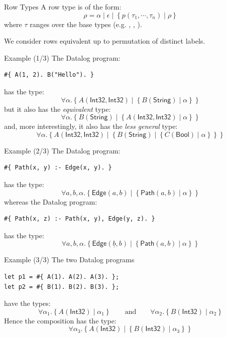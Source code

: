 \begin{frame}[fragile]{Row Types}
A row type is of the form:
$$
\rho = \alpha \mid \epsilon \mid \left \{ p (\tau_1, \cdots, \tau_n) \mid \rho \right \}
$$
where $\tau$ ranges over the base types (e.g. , , ).

\medskip

\pause

We consider rows equivalent up to permutation of distinct labels.
\end{frame}

\begin{frame}[fragile]{Example (1/3)}
The Datalog program:
%
\begin{lstlisting}[language=flix, xleftmargin=0.8cm]
#{ A(1, 2). B("Hello"). }
\end{lstlisting}    
%
has the type:
%
\[
\forall \alpha. \left\{ A(\textsf{Int32}, \textsf{Int32}) \mid \left\{ B(\textsf{String}) \mid \alpha \right\} \right\}
\]
%
\pause but it also has the \emph{equivalent} type:
%
\[
\forall \alpha. \left\{ B(\textsf{String}) \mid \left\{ A(\textsf{Int32}, \textsf{Int32}) \mid \alpha \right\} \right\}
\]
%
\pause and, more interestingly, it also has the \emph{less general} type:
%
\[
\forall \alpha. \left\{ A(\textsf{Int32}, \textsf{Int32}) \mid \left\{ B(\textsf{String}) \mid \left\{ C(\textsf{Bool}) \mid \alpha \right\} \right\} \right\}
\]
%
\end{frame}

\begin{frame}[fragile]{Example (2/3)}
The Datalog program:
%
\begin{lstlisting}[language=flix, xleftmargin=0.8cm]
#{ Path(x, y) :- Edge(x, y). }
\end{lstlisting}    
%
has the type:
%
\[
\forall a, b, \alpha. \left\{ \textsf{Edge}(a, b) \mid \left\{ \textsf{Path}(a, b) \mid \alpha \right\} \right\}
\]
%
\pause whereas the Datalog program:
%
\begin{lstlisting}[language=flix, xleftmargin=0.8cm]
#{ Path(x, z) :- Path(x, y), Edge(y, z). }
\end{lstlisting}    
%
\pause has the type:
%
\[
\forall a, b, \alpha. \left\{ \textsf{Edge}(\underline{b}, b) \mid \left\{ \textsf{Path}(a, b) \mid \alpha \right\} \right\}
\]
%
\end{frame}

\begin{frame}[fragile]{Example (3/3)}
The two Datalog programs
%
\begin{lstlisting}[language=flix, xleftmargin=0.8cm]
let p1 = #{ A(1). A(2). A(3). };
let p2 = #{ B(1). B(2). B(3). };
\end{lstlisting}    
%
have the types:
%
\[
\forall \alpha_1. \left\{ A(\textsf{Int32}) \mid \alpha_1 \right\}
\qquad \text{and} \qquad
\forall \alpha_2. \left\{ B(\textsf{Int32}) \mid \alpha_2 \right\}
\]
%
\pause Hence the composition  has the type:
%
\[
\forall \alpha_3. \left\{ A(\textsf{Int32}) \mid \left\{ B(\textsf{Int32}) \mid \alpha_3 \right\} \right\}
\]
%
\end{frame}

